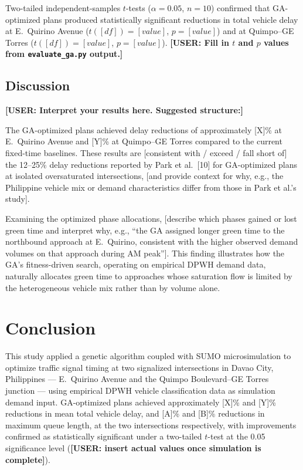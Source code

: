 \documentclass[a4paper,10pt]{article}
\begin{document}
	Two-tailed independent-samples $t$-tests ($\alpha = 0.05$, $n = 10$) confirmed that
	GA-optimized plans produced statistically significant reductions in total vehicle delay
	at E.~Quirino Avenue ($t([df]) = [value]$, $p = [value]$) and at Quimpo--GE Torres
	($t([df]) = [value]$, $p = [value]$). \textbf{[USER: Fill in $t$ and $p$ values
	from \texttt{evaluate\_ga.py} output.]}

	\subsection{Discussion}

	\textbf{[USER: Interpret your results here. Suggested structure:]}

	The GA-optimized plans achieved delay reductions of approximately [X]\% at E.~Quirino
	Avenue and [Y]\% at Quimpo--GE Torres compared to the current fixed-time baselines.
	These results are [consistent with / exceed / fall short of] the 12--25\% delay
	reductions reported by Park et al.~[10] for GA-optimized plans at isolated oversaturated
	intersections, [and provide context for why, e.g., the Philippine vehicle mix or demand
	characteristics differ from those in Park et al.'s study].

	Examining the optimized phase allocations, [describe which phases gained or lost green
	time and interpret why, e.g., ``the GA assigned longer green time to the northbound
	approach at E.~Quirino, consistent with the higher observed demand volumes on that
	approach during AM peak'']. This finding illustrates how the GA's fitness-driven
	search, operating on empirical DPWH demand data, naturally allocates green time to
	approaches whose saturation flow is limited by the heterogeneous vehicle mix rather
	than by volume alone.

	\section{Conclusion}

	This study applied a genetic algorithm coupled with SUMO microsimulation to optimize
	traffic signal timing at two signalized intersections in Davao City, Philippines ---
	E.~Quirino Avenue and the Quimpo Boulevard--GE Torres junction --- using empirical
	DPWH vehicle classification data as simulation demand input. GA-optimized plans
	achieved approximately [X]\% and [Y]\% reductions in mean total vehicle delay, and
	[A]\% and [B]\% reductions in maximum queue length, at the two intersections
	respectively, with improvements confirmed as statistically significant under a
	two-tailed $t$-test at the 0.05 significance level (\textbf{[USER: insert actual
	values once simulation is complete]}).
\end{document}

